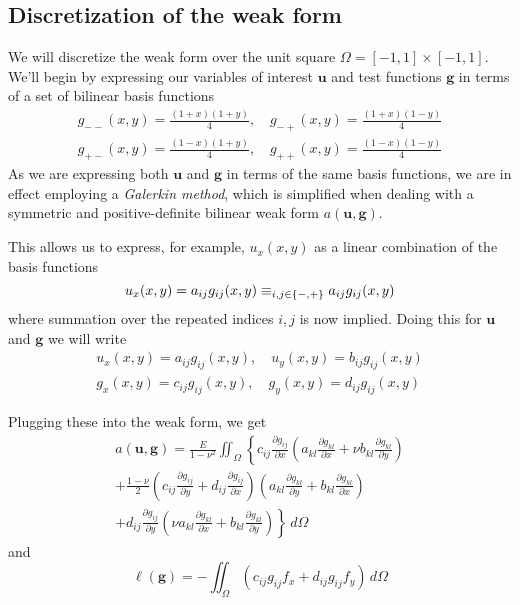 \documentclass[11pt]{article}
\let\sumop\relax
\newcommand\p[2]{\frac{\partial #1}{\partial #2}}
\begin{document}
\subsection{Discretization of the weak form}
We will discretize the weak form over the unit square $\Omega = [-1,1]\times[-1,1]$. We'll begin by expressing our variables of interest $\bm{u}$ and test functions $\bm{g}$ in terms of a set of bilinear basis functions
\begin{gather}
g_{--}(x,y) = \frac{(1+x)(1+y)}{4}, \quad g_{-+}(x,y) = \frac{(1+x)(1-y)}{4}\\
g_{+-}(x,y) = \frac{(1-x)(1+y)}{4}, \quad g_{++}(x,y) = \frac{(1-x)(1-y)}{4}
\end{gather}
As we are expressing both $\bm{u}$ and $\bm{g}$ in terms of the same basis functions, we are in effect employing a \emph{Galerkin method}, which is simplified when dealing with a symmetric and positive-definite bilinear weak form $a(\bm{u,g})$.

This allows us to express, for example, $u_x(x,y)$ as a linear combination of the basis functions
\begin{equation}
  u_x(x,y) = a_{ij}g_{ij}(x,y) \equiv \sumop_{i,j \in \{-,+\}} a_{ij}g_{ij}(x,y)
\end{equation}
where summation over the repeated indices $i,j$ is now implied. Doing this for $\bm{u}$ and $\bm{g}$ we will write
\begin{equation}
\begin{gathered}
  u_x(x,y) = a_{ij}g_{ij}(x,y), \quad u_y(x,y) = b_{ij}g_{ij}(x,y) \\
  g_x(x,y) = c_{ij}g_{ij}(x,y), \quad g_y(x,y) = d_{ij}g_{ij}(x,y)
\end{gathered}
\end{equation}

Plugging these into the weak form, we get
\begin{multline}
  a(\bm{u},\bm{g}) = \frac{E}{1-\nu^2} \iint_\Omega \left\{
    c_{ij}\p{g_{ij}}{x} \left(
      a_{kl}\p{g_{kl}}{x}
      + \nu b_{kl}\p{g_{kl}}{y}
    \right) \right. \\ \left.
  + \frac{1-\nu}{2} \left(
    c_{ij}\p{g_{ij}}{y}
    + d_{ij}\p{g_{ij}}{x}
  \right)
  \left(
    a_{kl}\p{g_{kl}}{y}
     + b_{kl}\p{g_{kl}}{x}
   \right) \right. \\ \left.
  + d_{ij}\p{g_{ij}}{y} \left(
    \nu a_{kl}\p{g_{kl}}{x}
    + b_{kl}\p{g_{kl}}{y}
  \right)
\right\} \, d\Omega
\end{multline}
and
\begin{equation}
  \ell(\bm{g}) = -\iint_\Omega \left( c_{ij}g_{ij}f_x + d_{ij}g_{ij} f_y \right) \, d\Omega
\end{equation}
\end{document}
